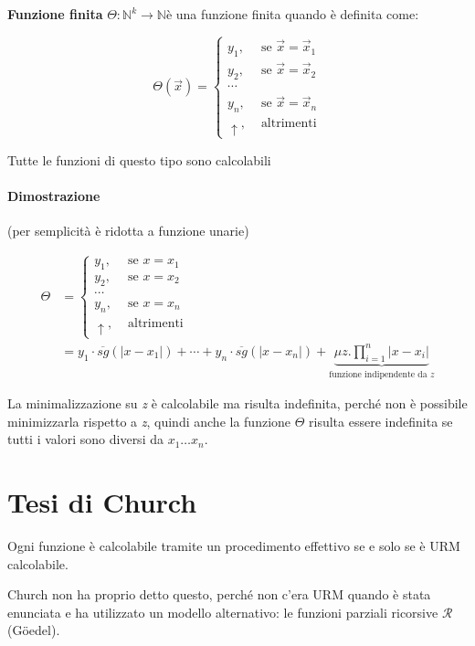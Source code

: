 \textbf{Funzione finita} $ \Theta: \mathbb{N}^{k} \rightarrow \mathbb{N}  $è una funzione
finita quando è definita come:

$$
\Theta(\vec{x}) = \begin{cases}
y_1, &\text{ se } \vec{x} = \vec{x}_1 \\
y_2, &\text{ se } \vec{x} = \vec{x}_2 \\ 
\cdots \\
y_n, &\text{ se } \vec{x} = \vec{x}_n \\
\uparrow, &\text{ altrimenti}
\end{cases}
$$

Tutte le funzioni di questo tipo sono calcolabili

\paragraph{Dimostrazione}\label{dimostrazione-1}

(per semplicità è ridotta a funzione unarie)

\begin{align*}
\Theta &= \begin{cases}
y_1, &\text{ se } x = x_1 \\
y_2, &\text{ se } x = x_2 \\ 
\cdots \\
y_n, &\text{ se } x = x_n \\
\uparrow, &\text{ altrimenti}
\end{cases} \\
&= y_1 \cdot \overline{sg}(|x - x_1|) + \cdots + y_n \cdot \overline{sg}(|x - x_n|) +  \underbrace{\mu z.\prod\limits_{i=1}^{n}|x - x_i|}_{\text{funzione indipendente da } z}
\end{align*}

La minimalizzazione su \emph{z} è calcolabile ma risulta indefinita, perché non è possibile minimizzarla rispetto a \emph{z}, quindi anche la funzione $ \Theta $ risulta essere indefinita se tutti i valori sono diversi da $ x_1 \ldots x_n $.

\section{Tesi di Church}\label{tesi-di-church}

Ogni funzione è calcolabile tramite un procedimento effettivo se e solo
se è URM calcolabile.

Church non ha proprio detto questo, perché non c'era URM quando è stata
enunciata e ha utilizzato un modello alternativo: le funzioni parziali
ricorsive $ \mathcal{R} $ (G\"{o}edel).

